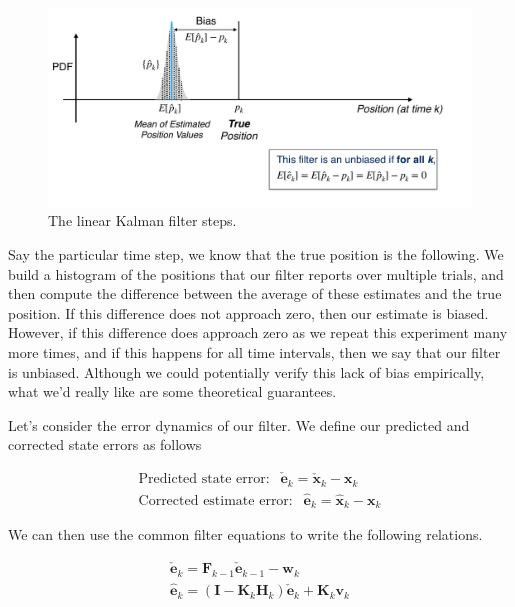 \begin{figure}[!htb]
\begin{center}
\includegraphics[scale=0.280]{img/kalman_filter/kalman_4.jpeg}
\end{center}
\caption{The linear Kalman filter steps.}
\label{kalman_4}
\end{figure}

Say the particular time step, we know that the true position is the following. We build a histogram of the positions that
our filter reports over multiple trials, and then compute the difference between
the average of these estimates and the true position. If this difference does not approach zero,
then our estimate is biased. However, if this difference does approach
zero as we repeat this experiment many more times, and
if this happens for all time intervals, then we say that our filter is unbiased. Although we could potentially verify
this lack of bias empirically, what we'd really like are some
theoretical guarantees. 

Let's consider the error dynamics of our filter. We define our predicted and corrected state
errors as follows

\begin{eqnarray}
\text{Predicted state error: }~~\check{\mathbf{e}}_k = \check{\mathbf{x}}_k - \mathbf{x}_k\\
\text{Corrected estimate error: }~~\hat{\mathbf{e}}_k = \hat{\mathbf{x}}_k - \mathbf{x}_k
\end{eqnarray}

We can then use the common filter equations to write
the following relations. 

\begin{eqnarray}
\check{\mathbf{e}}_k = \mathbf{F}_{k-1}\check{\mathbf{e}}_{k-1} - \mathbf{w}_k \\
\hat{\mathbf{e}}_k = (\mathbf{I} - \mathbf{K}_k\mathbf{H}_k)\check{\mathbf{e}}_k + \mathbf{K}_k\mathbf{v}_k
\end{eqnarray}

